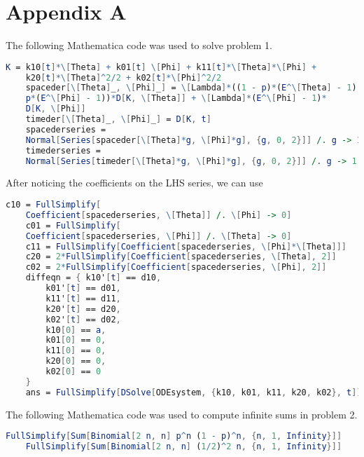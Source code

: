 \documentclass{article}
\begin{document}
\section{Appendix A}
The following Mathematica code was used to solve problem 1.
\begin{lstlisting}[language=Mathematica]
	K = k10[t]*\[Theta] + k01[t] \[Phi] + k11[t]*\[Theta]*\[Phi] + 
	k20[t]*\[Theta]^2/2 + k02[t]*\[Phi]^2/2
	spaceder[\[Theta]_, \[Phi]_] = \[Lambda]*((1 - p)*(E^\[Theta] - 1) + 
	p*(E^\[Phi] - 1))*D[K, \[Theta]] + \[Lambda]*(E^\[Phi] - 1)*
	D[K, \[Phi]]
	timeder[\[Theta]_, \[Phi]_] = D[K, t]
	spacederseries = 
	Normal[Series[spaceder[\[Theta]*g, \[Phi]*g], {g, 0, 2}]] /. g -> 1
	timederseries = 
	Normal[Series[timeder[\[Theta]*g, \[Phi]*g], {g, 0, 2}]] /. g -> 1
\end{lstlisting}
After noticing the coefficients on the LHS series, we can use
\begin{lstlisting}[language=Mathematica]
	c10 = FullSimplify[
	Coefficient[spacederseries, \[Theta]] /. \[Phi] -> 0]
	c01 = FullSimplify[
	Coefficient[spacederseries, \[Phi]] /. \[Theta] -> 0]
	c11 = FullSimplify[Coefficient[spacederseries, \[Phi]*\[Theta]]]
	c20 = 2*FullSimplify[Coefficient[spacederseries, \[Theta], 2]]
	c02 = 2*FullSimplify[Coefficient[spacederseries, \[Phi], 2]]
	diffeqn = { k10'[t] == d10,
		k01'[t] == d01,
		k11'[t] == d11,
		k20'[t] == d20,
		k02'[t] == d02,
		k10[0] == a,
		k01[0] == 0,
		k11[0] == 0,
		k20[0] == 0,
		k02[0] == 0
	}
	ans = FullSimplify[DSolve[ODEsystem, {k10, k01, k11, k20, k02}, t]]
\end{lstlisting}
The following Mathematica code was used to compute infinite sums in problem 2.
\begin{lstlisting}[language=Mathematica]
	FullSimplify[Sum[Binomial[2 n, n] p^n (1 - p)^n, {n, 1, Infinity}]]
	FullSimplify[Sum[Binomial[2 n, n] (1/2)^2 n, {n, 1, Infinity}]]
\end{lstlisting}
\end{document}
